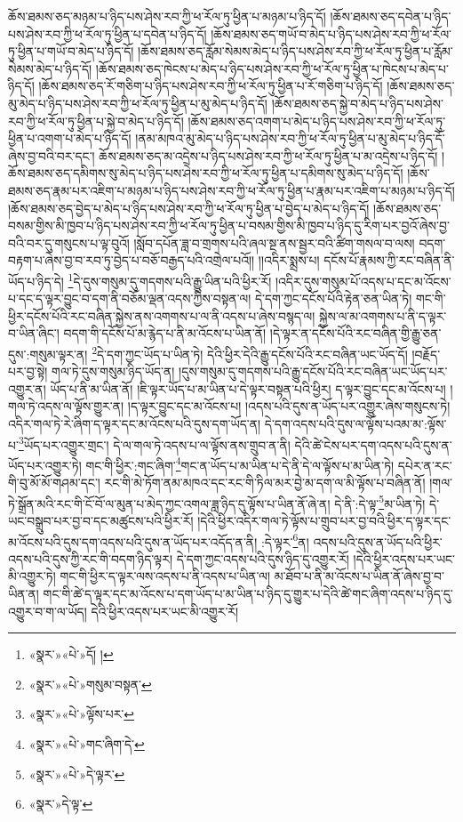 ཆོས་ཐམས་ཅད་མཉམ་པ་ཉིད་པས་ཤེས་རབ་ཀྱི་ཕ་རོལ་ཏུ་ཕྱིན་པ་མཉམ་པ་ཉིད་དོ། །ཆོས་ཐམས་ཅད་དབེན་པ་ཉིད་པས་ཤེས་རབ་ཀྱི་ཕ་རོལ་ཏུ་ཕྱིན་པ་དབེན་པ་ཉིད་དོ། །ཆོས་ཐམས་ཅད་གཡོ་བ་མེད་པ་ཉིད་པས་ཤེས་རབ་ཀྱི་ཕ་རོལ་ཏུ་ཕྱིན་པ་གཡོ་བ་མེད་པ་ཉིད་དོ། །ཆོས་ཐམས་ཅད་རློམ་སེམས་མེད་པ་ཉིད་པས་ཤེས་རབ་ཀྱི་ཕ་རོལ་ཏུ་ཕྱིན་པ་རློམ་སེམས་མེད་པ་ཉིད་དོ། །ཆོས་ཐམས་ཅད་ཁེངས་པ་མེད་པ་ཉིད་པས་ཤེས་རབ་ཀྱི་ཕ་རོལ་ཏུ་ཕྱིན་པ་ཁེངས་པ་མེད་པ་ཉིད་དོ། །ཆོས་ཐམས་ཅད་རོ་གཅིག་པ་ཉིད་པས་ཤེས་རབ་ཀྱི་ཕ་རོལ་ཏུ་ཕྱིན་པ་རོ་གཅིག་པ་ཉིད་དོ། །ཆོས་ཐམས་ཅད་མུ་མེད་པ་ཉིད་པས་ཤེས་རབ་ཀྱི་ཕ་རོལ་ཏུ་ཕྱིན་པ་མུ་མེད་པ་ཉིད་དོ། །ཆོས་ཐམས་ཅད་སྐྱེ་བ་མེད་པ་ཉིད་པས་ཤེས་རབ་ཀྱི་ཕ་རོལ་ཏུ་ཕྱིན་པ་སྐྱེ་བ་མེད་པ་ཉིད་དོ། །ཆོས་ཐམས་ཅད་འགག་པ་མེད་པ་ཉིད་པས་ཤེས་རབ་ཀྱི་ཕ་རོལ་ཏུ་ཕྱིན་པ་འགག་པ་མེད་པ་ཉིད་དོ། །ནམ་མཁའ་མུ་མེད་པ་ཉིད་པས་ཤེས་རབ་ཀྱི་ཕ་རོལ་ཏུ་ཕྱིན་པ་མུ་མེད་པ་ཉིད་དོ་ཞེས་བྱ་བའི་བར་དང་། ཆོས་ཐམས་ཅད་མ་འདྲེས་པ་ཉིད་པས་ཤེས་རབ་ཀྱི་ཕ་རོལ་ཏུ་ཕྱིན་པ་མ་འདྲེས་པ་ཉིད་དོ། །ཆོས་ཐམས་ཅད་དམིགས་སུ་མེད་པ་ཉིད་པས་ཤེས་རབ་ཀྱི་ཕ་རོལ་ཏུ་ཕྱིན་པ་དམིགས་སུ་མེད་པ་ཉིད་དོ། །ཆོས་ཐམས་ཅད་རྣམ་པར་འཇིག་པ་མཉམ་པ་ཉིད་པས་ཤེས་རབ་ཀྱི་ཕ་རོལ་ཏུ་ཕྱིན་པ་རྣམ་པར་འཇིག་པ་མཉམ་པ་ཉིད་དོ། །ཆོས་ཐམས་ཅད་བྱེད་པ་མེད་པ་ཉིད་པས་ཤེས་རབ་ཀྱི་ཕ་རོལ་ཏུ་ཕྱིན་པ་བྱེད་པ་མེད་པ་ཉིད་དོ། །ཆོས་ཐམས་ཅད་བསམ་གྱིས་མི་ཁྱབ་པ་ཉིད་པས་ཤེས་རབ་ཀྱི་ཕ་རོལ་ཏུ་ཕྱིན་པ་བསམ་གྱིས་མི་ཁྱབ་པ་ཉིད་དུ་རིག་པར་བྱའོ་ཞེས་བྱ་བའི་བར་དུ་གསུངས་པ་ལྟ་བུའོ། །སློབ་དཔོན་ཟླ་བ་གྲགས་པའི་ཞལ་སྔ་ནས་སྦྱར་བའི་ཚིག་གསལ་བ་ལས། བདག་བརྟག་པ་ཞེས་བྱ་བ་རབ་ཏུ་བྱེད་པ་བཅོ་བརྒྱད་པའི་འགྲེལ་པའོ།། །།འདིར་སྨྲས་པ། དངོས་པོ་རྣམས་ཀྱི་རང་བཞིན་ནི་ཡོད་པ་ཉིད་དེ། \footnote{«སྣར་»«པེ་»དོ། ། }དེ་དུས་གསུམ་དུ་གདགས་པའི་རྒྱུ་ཡིན་པའི་ཕྱིར་རོ། །འདིར་དུས་གསུམ་པོ་འདས་པ་དང་མ་འོངས་པ་དང་ད་ལྟར་བྱུང་བ་དག་ནི་བཅོམ་ལྡན་འདས་ཀྱིས་བསྟན་ལ། དེ་དག་ཀྱང་དངོས་པོའི་རྟེན་ཅན་ཡིན་ཏེ། གང་གི་ཕྱིར་དངོས་པོའི་རང་བཞིན་སྐྱེས་ནས་འགགས་པ་ལ་ནི་འདས་པ་ཞེས་བསྙད་ལ། སྐྱེས་ལ་མ་འགགས་པ་ནི་ད་ལྟར་བ་ཡིན་ཞིང་། བདག་གི་དངོས་པོ་མ་རྙེད་པ་ནི་མ་འོངས་པ་ཡིན་ནོ། །དེ་ལྟར་ན་དངོས་པོའི་རང་བཞིན་གྱི་རྒྱུ་ཅན་དུས་:གསུམ་ལྟར་ན། \footnote{«སྣར་»«པེ་»གསུམ་བསྟན་}དེ་དག་ཀྱང་ཡོད་པ་ཡིན་ཏེ། དེའི་ཕྱིར་དེའི་རྒྱུ་དངོས་པོའི་རང་བཞིན་ཡང་ཡོད་དོ། །བརྗོད་པར་བྱ་སྟེ། གལ་ཏེ་དུས་གསུམ་ཉིད་ཡོད་ན། །དུས་གསུམ་དུ་གདགས་པའི་རྒྱུ་དངོས་པོའི་རང་བཞིན་ཡང་ཡོད་པར་འགྱུར་ན། ཡོད་པ་ནི་མ་ཡིན་ནོ། །ཇི་ལྟར་ཡོད་པ་མ་ཡིན་པ་དེ་ལྟར་བསྟན་པའི་ཕྱིར། ད་ལྟར་བྱུང་དང་མ་འོངས་པ། །གལ་ཏེ་འདས་ལ་ལྟོས་གྱུར་ན། །ད་ལྟར་བྱུང་དང་མ་འོངས་པ། །འདས་པའི་དུས་ན་ཡོད་པར་འགྱུར་ཞེས་གསུངས་ཏེ། འདིར་གལ་ཏེ་རེ་ཞིག་ད་ལྟར་དང་མ་འོངས་པའི་དུས་དག་ཡོད་ན། དེ་དག་འདས་པའི་དུས་ལ་ལྟོས་པའམ་མ་:ལྟོས་པ་\footnote{«སྣར་»«པེ་»ལྟོས་པར་}ཡོད་པར་འགྱུར་གྲང་། དེ་ལ་གལ་ཏེ་འདས་པ་ལ་ལྟོས་ནས་གྲུབ་ན་ནི། དེའི་ཚེ་ངེས་པར་དག་འདས་པའི་དུས་ན་ཡོད་པར་འགྱུར་ཏེ། གང་གི་ཕྱིར་:གང་ཞིག་\footnote{«སྣར་»«པེ་»གང་ཞིག་དེ་}གང་ན་ཡོད་པ་མ་ཡིན་པ་དེ་ནི་དེ་ལ་ལྟོས་པ་མ་ཡིན་ཏེ། དཔེར་ན་རང་གི་བུ་མོ་མོ་གཤམ་དང་། རང་གི་མེ་ཏོག་ནམ་མཁའ་དང་རང་གི་ཏིལ་མར་བྱེ་མ་དག་ལ་མི་ལྟོས་པ་བཞིན་ནོ། །གལ་ཏེ་སྒྲོན་མའི་རང་གི་ངོ་བོ་ལ་མུན་པ་མེད་ཀྱང་འགལ་ཟླ་ཉིད་དུ་ལྟོས་པ་ཡིན་ནོ་ཞེ་ན། དེ་ནི་:དེ་ལྟ་\footnote{«སྣར་»«པེ་»དེ་ལྟར་}མ་ཡིན་ཏེ། དེ་ཡང་བསྒྲུབ་པར་བྱ་བ་དང་མཚུངས་པའི་ཕྱིར་རོ། །དེའི་ཕྱིར་འདིར་གལ་ཏེ་ལྟོས་པ་གྲུབ་པར་བྱ་བའི་ཕྱིར་ད་ལྟར་དང་མ་འོངས་པའི་དུས་དག་འདས་པའི་དུས་ན་ཡོད་པར་འདོད་ན་ནི། :དེ་ལྟར་\footnote{«སྣར་»དེ་ལྟ་}ན། འདས་པའི་དུས་ན་ཡོད་པའི་ཕྱིར་འདས་པའི་དུས་ཀྱི་རང་གི་བདག་ཉིད་ལྟར། དེ་དག་ཀྱང་འདས་པའི་དུས་ཉིད་དུ་འགྱུར་རོ། །དེའི་ཕྱིར་འདས་པར་ཡང་མི་འགྱུར་ཏེ། གང་གི་ཕྱིར་ད་ལྟར་ལས་འདས་པ་ནི་འདས་པ་ཡིན་ལ། མ་ཐོབ་པ་ནི་མ་འོངས་པ་ཡིན་ནོ་ཞེས་བྱ་བ་ཡིན་ན། གང་གི་ཚེ་ད་ལྟར་དང་མ་འོངས་པ་དག་ཡོད་པ་མ་ཡིན་པ་ཉིད་དུ་གྱུར་པ་དེའི་ཚེ་གང་ཞིག་འདས་པ་ཉིད་དུ་འགྱུར་བ་ག་ལ་ཡོད། དེའི་ཕྱིར་འདས་པར་ཡང་མི་འགྱུར་རོ། 